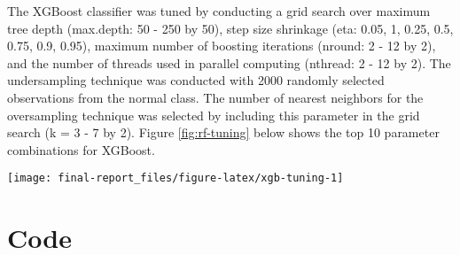 \begin{appendix}
The XGBoost classifier was tuned by conducting a grid search over
maximum tree depth (max.depth: 50 - 250 by 50), step size shrinkage
(eta: 0.05, 1, 0.25, 0.5, 0.75, 0.9, 0.95), maximum number of boosting
iterations (nround: 2 - 12 by 2), and the number of threads used in
parallel computing (nthread: 2 - 12 by 2). The undersampling technique
was conducted with 2000 randomly selected observations from the normal
class. The number of nearest neighbors for the oversampling technique
was selected by including this parameter in the grid search (k = 3 - 7
by 2). Figure \ref{fig:rf-tuning} below shows the top 10 parameter
combinations for XGBoost.

\begin{center}\texttt{[image: final-report\_files/figure-latex/xgb-tuning-1]} \end{center}

\clearpage

\hypertarget{code}{%
\section{\texorpdfstring{Code \label{app:code}}{Code }}\label{code}}


\end{appendix}
